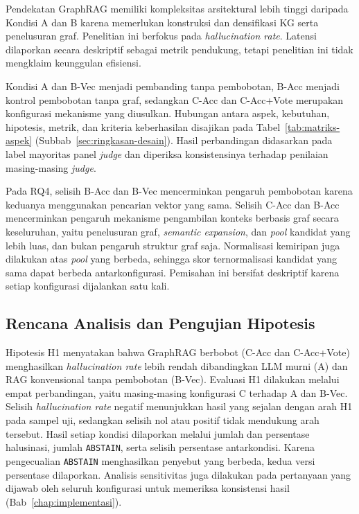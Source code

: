 Pendekatan GraphRAG memiliki kompleksitas arsitektural lebih tinggi daripada Kondisi A dan B karena memerlukan konstruksi dan densifikasi KG serta penelusuran graf. Penelitian ini berfokus pada \emph{hallucination rate}. Latensi dilaporkan secara deskriptif sebagai metrik pendukung, tetapi penelitian ini tidak mengklaim keunggulan efisiensi.

Kondisi A dan B-Vec menjadi pembanding tanpa pembobotan, B-Acc menjadi kontrol pembobotan tanpa graf, sedangkan C-Acc dan C-Acc+Vote merupakan konfigurasi mekanisme yang diusulkan. Hubungan antara aspek, kebutuhan, hipotesis, metrik, dan kriteria keberhasilan disajikan pada Tabel~\ref{tab:matriks-aspek} (Subbab~\ref{sec:ringkasan-desain}). Hasil perbandingan didasarkan pada label mayoritas panel \emph{judge} dan diperiksa konsistensinya terhadap penilaian masing-masing \emph{judge}.

Pada RQ4, selisih B-Acc dan B-Vec mencerminkan pengaruh pembobotan karena keduanya menggunakan pencarian vektor yang sama. Selisih C-Acc dan B-Acc mencerminkan pengaruh mekanisme pengambilan konteks berbasis graf secara keseluruhan, yaitu penelusuran graf, \emph{semantic expansion}, dan \emph{pool} kandidat yang lebih luas, dan bukan pengaruh struktur graf saja. Normalisasi kemiripan juga dilakukan atas \emph{pool} yang berbeda, sehingga skor ternormalisasi kandidat yang sama dapat berbeda antarkonfigurasi. Pemisahan ini bersifat deskriptif karena setiap konfigurasi dijalankan satu kali.

\subsection{Rencana Analisis dan Pengujian Hipotesis}
\label{subsec:analisis-hipotesis}

Hipotesis H1 menyatakan bahwa GraphRAG berbobot (C-Acc dan C-Acc+Vote) menghasilkan \emph{hallucination rate} lebih rendah dibandingkan LLM murni (A) dan RAG konvensional tanpa pembobotan (B-Vec). Evaluasi H1 dilakukan melalui empat perbandingan, yaitu masing-masing konfigurasi C terhadap A dan B-Vec. Selisih \emph{hallucination rate} negatif menunjukkan hasil yang sejalan dengan arah H1 pada sampel uji, sedangkan selisih nol atau positif tidak mendukung arah tersebut. Hasil setiap kondisi dilaporkan melalui jumlah dan persentase halusinasi, jumlah \texttt{ABSTAIN}, serta selisih persentase antarkondisi. Karena pengecualian \texttt{ABSTAIN} menghasilkan penyebut yang berbeda, kedua versi persentase dilaporkan. Analisis sensitivitas juga dilakukan pada pertanyaan yang dijawab oleh seluruh konfigurasi untuk memeriksa konsistensi hasil (Bab~\ref{chap:implementasi}).


